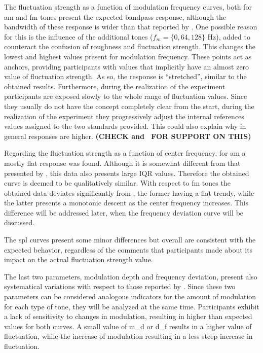 \documentclass[../main.tex]{subfiles}
\begin{document}
The fluctuation strength as a function of modulation frequency curves, both for
\gls{am} and \gls{fm} tones present the expected bandpass response, although
the bandwidth of these response is wider than that reported by
\citeauthor{Fastl2007Psychoacoustics}. One possible reason for this is the
influence of the additional tones ($f_m = \{0, 64, 128\}$ Hz), added to
counteract the confusion of roughness and fluctuation strength. This changes
the lowest and highest values present for modulation frequency. These points
act as anchors, providing participants with values that implicitly have an
almost zero value of fluctuation strength. As so, the response is ``stretched'',
similar to the obtained results. Furthermore, during the realization of the
experiment participants are exposed slowly to the whole range of fluctuation
values. Since they usually do not have the concept completely clear from the
start, during the realization of the experiment they progressively adjust the
internal references values assigned to the two standards provided. This could
also explain why in general responses are higher. {\color{red} \bf (CHECK
\cite{Krantz1972} and~\cite{Marley1972} FOR SUPPORT ON THIS)}

Regarding the fluctuation strength as a function of center frequency, for
\gls{am} a mostly flat response was found. Although it is somewhat different
from that presented by \citeauthor{Fastl2007Psychoacoustics}, this data also
presents large \gls{IQR} values. Therefore the obtained curve is deemed to be
qualitatively similar. With respect to \gls{fm} tones the obtained data
deviates significantly from \citeauthor{Fastl2007Psychoacoustics}, the former
having a flat trendy, while the latter presents a monotonic descent as the
center frequency increases. This difference will be addressed later, when the
frequency deviation curve will be discussed.

The \gls{spl} curves present some minor differences but overall are consistent
with the expected behavior, regardless of the comments that participants made
about its impact on the actual fluctuation strength value.

The last two parameters, modulation depth and frequency deviation, present also
systematical variations with respect to those reported by
\citeauthor{Fastl2007Psychoacoustics}. Since these two parameters can be
considered analogous indicators for the amount of modulation for each type of
tone, they will be analyzed at the same time. Participants exhibit a lack of
sensitivity to changes in modulation, resulting in higher than expected values
for both curves. A small value of \gls{m_d} or \gls{d_f} results in a higher
value of fluctuation, while the increase of modulation resulting in a less
steep increase in fluctuation.
\end{document}
